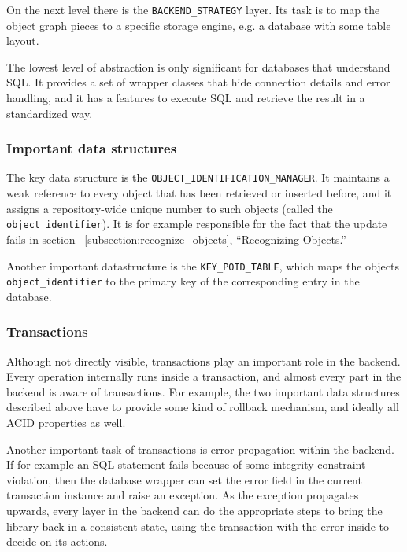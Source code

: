 On the next level there is the \lstinline!BACKEND_STRATEGY! layer.
Its task is to map the object graph pieces to a specific storage engine, e.g. a database with some table layout.

The lowest level of abstraction is only significant for databases that understand SQL. 
It provides a set of wrapper classes that hide connection details and error handling, and it has a features to execute SQL and retrieve the result in a standardized way.

\subsubsection{Important data structures}

The key data structure is the \lstinline!OBJECT_IDENTIFICATION_MANAGER!.
It maintains a weak reference to every object that has been retrieved or inserted before, and it assigns a repository-wide unique number to such objects (called the \lstinline!object_identifier!).
It is for example responsible for the fact that the update fails in section ~\ref{subsection:recognize_objects}, ``Recognizing Objects.''

Another important datastructure is the \lstinline!KEY_POID_TABLE!, which maps the objects \lstinline!object_identifier! to the primary key of the corresponding entry in the database.

\subsubsection{Transactions}

Although not directly visible, transactions play an important role in the backend.
Every operation internally runs inside a transaction, and almost every part in the backend is aware of transactions.
For example, the two important data structures described above have to provide some kind of rollback mechanism, and ideally all ACID %
properties as well.

Another important task of transactions is error propagation within the backend.
If for example an SQL statement fails because of some integrity constraint violation, then the database wrapper can set the error field in the current transaction instance and raise an exception.
As the exception propagates upwards, every layer in the backend can do the appropriate steps to bring the library back in a consistent state, using the transaction with the error inside to decide on its actions.

